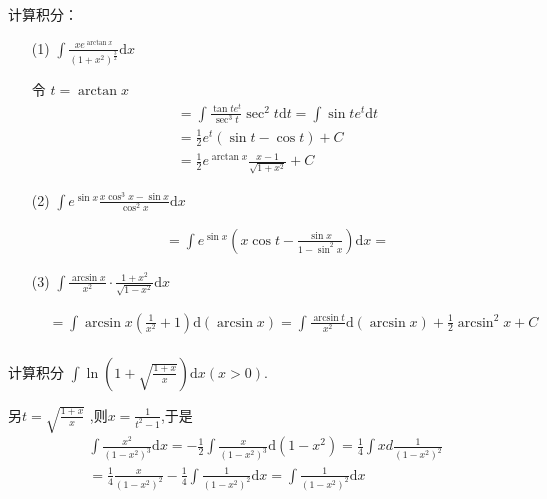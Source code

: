 \begin{xiti}
\item 计算积分：
\begin{enumerate}
	\item[(1)] $\int \frac { x e ^ { \arctan x } } { \left( 1 + x ^ { 2 } \right) ^ { \frac { 3 } { 2 } } } \mathrm { d } x$
	\begin{solution}
		令 $t=\arctan x$ 
		\begin{align*}
			&= \int \frac{\tan t e^t}{\sec^3 t} \sec^2 t \mathrm{d} t= \int \sin t e^t \mathrm{d}t \\
			&=\frac{1}{2} e^t(\sin t-\cos t) +C \\
			&=\frac{1}{2} e^{\arctan x} \frac{x-1}{\sqrt{1+x^2}}+C%
		\end{align*}
	\end{solution}
	\item[(2)]  $\int e ^ { \sin x } \frac { x \cos ^ { 3 } x - \sin x } { \cos ^ { 2 } x }\mathrm{d}x$
	\begin{solution}
		\begin{align*}
			&=\int e^{\sin x}(x \cos t-\frac{\sin x}{1-\sin^2 x})\mathrm{d} x=
		\end{align*}
	\end{solution}	
	\item[(3)]  $\int \frac { \arcsin x } { x ^ { 2 } } \cdot \frac { 1 + x ^ { 2 } } { \sqrt { 1 - x ^ { 2 } } } \mathrm { d } x$
	\begin{solution}
		\begin{align*}
			&=\int \arcsin x (\frac{1}{x^2}+1) \mathrm{d} (\arcsin x)= \int \frac{\arcsin t}{x^2} \mathrm{d} (\arcsin x) +\frac{1}{2} \arcsin^2 x +C\\
			&
		\end{align*}
	\end{solution}
\end{enumerate}	
\item 计算积分
$\int \ln \left( 1 + \sqrt { \frac { 1 + x } { x } } \right) \mathrm { d } x ( x > 0 )$.
	\begin{solution}
	另$t=\sqrt{\frac {1 + x}{x}}$ ,则$x=\frac{1}{t^2 - 1}$,于是 \\
	\begin{align*} 
		&{} \int \frac{x^{2}}{\left(1-x^{2}\right)^{3}} \mathrm{d} x =-\frac{1}{2} \int \frac{x}{\left(1-x^{2}\right)^{3}} \mathrm{d}\left(1-x^{2}\right)=\frac{1}{4} \int x d \frac{1}{\left(1-x^{2}\right)^{2}} \\ 
		&{}=\frac{1}{4} \frac{x}{\left(1-x^{2}\right)^{2}}-\frac{1}{4} \int \frac{1}{\left(1-x^{2}\right)^{2}} \mathrm{d} x = \int \frac{1}{\left(1-x^{2}\right)^{2}} \mathrm{d} x \\

\end{align*}
\end{solution}
\end{xiti}
